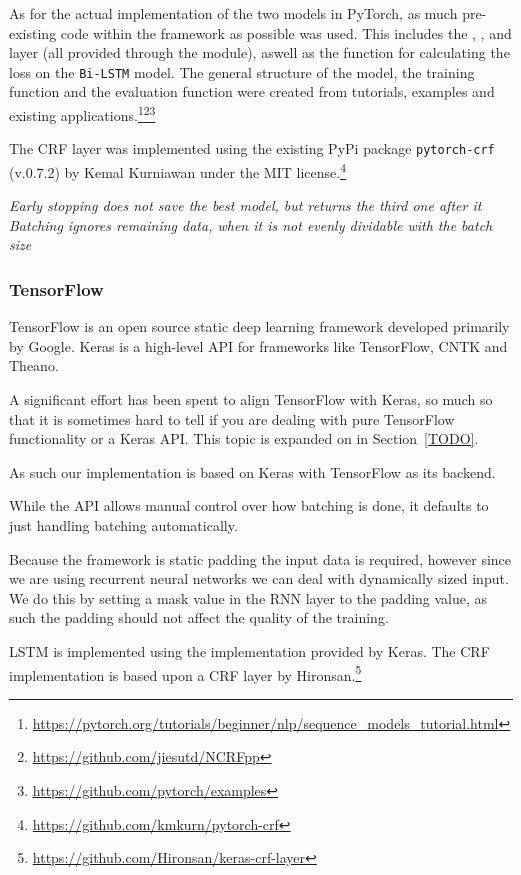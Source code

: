 As for the actual implementation of the two models in PyTorch, as much
pre-existing code within the framework as possible was used. This includes the
, ,  and  layer (all
provided through the  module), aswell as the
 function for calculating the loss on the
\texttt{Bi-LSTM} model. The general structure of the model, the training
function and the evaluation function were created from tutorials, examples and
existing applications.\footnote{\url{https://pytorch.org/tutorials/beginner/nlp/sequence_models_tutorial.html}}\footnote{\url{https://github.com/jiesutd/NCRFpp}}\footnote{\url{https://github.com/pytorch/examples}}

The CRF layer was implemented using the existing PyPi package
\texttt{pytorch-crf} (v.0.7.2) by Kemal Kurniawan under the MIT
license.\footnote{\url{https://github.com/kmkurn/pytorch-crf}}

\textit{Early stopping does not save the best model, but returns the third one
after it}
\textit{Batching ignores remaining data, when it is not evenly dividable with the
batch size}


\subsubsection*{TensorFlow}
TensorFlow is an open source static deep learning framework developed primarily
by Google. Keras is a high-level API for frameworks like TensorFlow, CNTK and
Theano.

A significant effort has been spent to align TensorFlow with Keras, so much so
that it is sometimes hard to tell if you are dealing with pure TensorFlow
functionality or a Keras API\@. This topic is expanded on in Section~\ref{TODO}.

As such our implementation is based on Keras with TensorFlow as its
backend.

While the API allows manual control over how batching is done, it defaults to
just handling batching automatically.

Because the framework is static padding the input data is required, however
since we are using recurrent neural networks we can deal with dynamically sized
input. We do this by setting a mask value in the RNN layer to the padding
value, as such the padding should not affect the quality of the training.

LSTM is implemented using the implementation provided by Keras.
The CRF implementation is based upon a CRF layer by
Hironsan.\footnote{\url{https://github.com/Hironsan/keras-crf-layer}}

